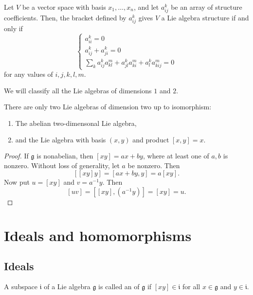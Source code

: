 \documentclass{article}
\newcommand{\lb}[1]{\ensuremath{\left[{#1}\right]}}
\newcommand{\frkg}{{\ensuremath{\mathfrak{g}}}}
\newcommand{\frki}{{\ensuremath{\mathfrak{i}}}}
\begin{document}
\begin{proposition}
    Let $V$ be a vector space with basis $x_1,\ldots,x_n$, and let $a_{ij}^k$ be an array of structure coefficients.
    Then, the bracket defined by $a_{ij}^k$ gives $V$ a Lie algebra structure if and only if
    \[
        \begin{cases}
            a_{ii}^k = 0 \\
            a_{ij}^k + a_{ji}^k = 0 \\
            \sum_k
            a_{ij}^ka_{kl}^m
            + a_{jl}^ka_{ki}^m
            + a_{l}^ka_{kij}^m
            =
            0
        \end{cases}
    \]
    for any values of $i,j,k,l,m$.
\end{proposition}

We will classify all the Lie algebras of dimensions $1$ and $2$.

\begin{proposition}
    There are only two Lie algebras of dimension two up to isomorphism:
    \begin{enumerate}[label=(\alph*)]
        \item 
            The abelian two-dimensonal Lie algebra,
        \item 
            and the Lie algebra with basis $(x,y)$ and product $[x,y] = x$.
    \end{enumerate}
\end{proposition}

\begin{proof}
    If $\frkg$ is nonabelian, then $\lb{xy} = ax + by$, where at least one of $a, b$ is nonzero.
    Without loss of generality, let $a$ be nonzero.
    Then
    \[
        \lb{\lb{xy}y}
        =
        \lb{ax + by,y}
        =
        a\lb{xy}.
    \]
    Now put $u = \lb{xy}$ and $v = a^{-1}y$.
    Then
    \[
        \lb{uv}
        =
        \lb{\lb{xy},(a^{-1}y)}
        =
        \lb{xy}
        =
        u.
    \]
\end{proof}

\section{Ideals and homomorphisms}

\subsection{Ideals}

\begin{definition}
    A subspace $\frki$ of a Lie algebra $\frkg$ is called an  of $\frkg$ if $\lb{xy} \in \frki$ for all $x \in \frkg$ and $y \in \frki$.
\end{definition}
\end{document}
